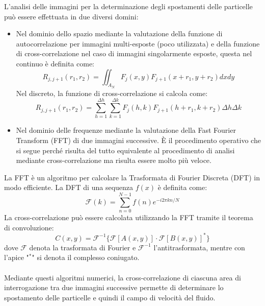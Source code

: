 L'analisi delle immagini per la determinazione degli spostamenti delle particelle può essere effettuata in due diversi domini:
\begin{itemize}
    \item Nel dominio dello spazio mediante la valutazione della funzione di autocorrelazione per immagini multi-esposte (poco utilizzata) e della funzione di cross-correlazione nel caso di immagini singolarmente esposte, questa nel continuo è definita come:
    \begin{equation*}
        R_{j,j+1}(r_1,r_2) = \iint_{A_N} F_j(x,y)F_{j+1}(x+r_1,y+r_2)dxdy
    \end{equation*}
    Nel discreto, la funzione di cross-correlazione si calcola come:
    \begin{equation*}
        R_{j,j+1}(r_1,r_2) = \sum_{h=1}^{\Delta h}\sum_{k=1}^{\Delta k} F_j(h,k) F_{j+1}(h+r_1, k+r_2)\Delta h \Delta k
    \end{equation*}
    \item Nel dominio delle frequenze mediante la valutazione della Fast Fourier Transform (FFT) di due immagini successive. È il procedimento operativo che si segue perché risulta del tutto equivalente al procedimento di analisi mediante cross-correlazione ma risulta essere molto più veloce.
\end{itemize}

\noindent La FFT è un algoritmo per calcolare la Trasformata di Fourier Discreta (DFT) in modo efficiente. La DFT di una sequenza $f(x)$ è definita come:
\begin{equation*}
    \mathcal F(k) = \sum_{n=0}^{N-1} f(n) e^{-i 2 \pi k n / N}
\end{equation*}
La cross-correlazione può essere calcolata utilizzando la FFT tramite il teorema di convoluzione:
\begin{equation*}
C(x, y) = \mathcal{F}^{-1} \{ \mathcal{F}[A(x, y)] \cdot \mathcal{F}[B(x, y)]^* \}
\end{equation*}
dove $\mathcal{F}$ denota la trasformata di Fourier e $\mathcal{F}^{-1}$ l'antitrasformata, mentre con l'apice "$^*$" si denota il complesso coniugato.\\\\
Mediante questi algoritmi numerici, la cross-correlazione di ciascuna area di interrogazione tra due immagini successive permette di determinare lo spostamento delle particelle e quindi il campo di velocità del fluido.

